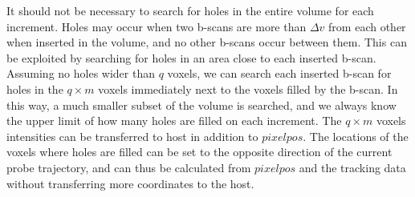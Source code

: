 It should not be necessary to search for holes in the entire volume for each increment. Holes may occur when two b-scans are more than $\Delta v$ from each other when inserted in the volume, and no other b-scans occur between them. This can be exploited by searching for holes in an area close to each inserted b-scan. Assuming no holes wider than $q$ voxels, we can search each inserted b-scan for holes in the $q \times m$ voxels immediately next to the voxels filled by the b-scan. In this way, a much smaller subset of the volume is searched, and we always know the upper limit of how many holes are filled on each increment. The $q \times m$ voxels intensities can be transferred to host in addition to $pixelpos$. The locations of the voxels where holes are filled can be set to the opposite direction of the current probe trajectory, and can thus be calculated from $pixelpos$ and the tracking data without transferring more coordinates to the host.